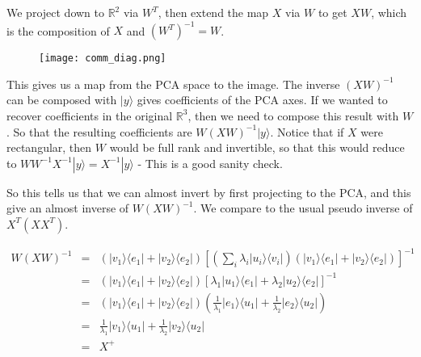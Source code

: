 \documentclass{amsbook}
\begin{document}

We project down to $\mathbb R^2$ via $W^T$, then extend the map $X$ via $W$ to get $XW$, which is the composition of $X$ and $(W^T)^{-1}=W$.

\begin{figure}
  \centering
  \texttt{[image: comm\_diag.png]}
\end{figure}

This gives us a map from the PCA space to the image.  The inverse $\left(XW\right)^{-1}$ can be composed with $|y\rangle$ gives coefficients of the PCA axes.  If we wanted to recover coefficients in the original $\mathbb R^3$, then we need to compose this result with $W$.  So that the resulting coefficients are $W\left(XW\right)^{-1}|y\rangle$.  Notice that if $X$ were rectangular, then $W$ would be full rank and invertible, so that this would reduce to $WW^{-1}X^{-1}|y\rangle=X^{-1}|y\rangle$ - This is a good sanity check.

So this tells us that we can almost invert by first projecting to the PCA, and this give an almost inverse of $W\left(XW\right)^{-1}$.  We compare to the usual pseudo inverse of $X^T\left(XX^T\right)$.

$$
\begin{array}{rcl}
W\left(XW\right)^{-1} &=& \left(|v_1\rangle\langle e_1|+|v_2\rangle\langle e_2|\right)\left[\left(\sum_i\lambda_i|u_i\rangle\langle v_i|\right)\left(|v_1\rangle\langle e_1|+|v_2\rangle\langle e_2|\right)\right]^{-1} \\
 &=& \left(|v_1\rangle\langle e_1|+|v_2\rangle\langle e_2|\right)\left[\lambda_1|u_1\rangle\langle e_1|+\lambda_2|u_2\rangle\langle e_2|\right]^{-1} \\
 &=& \left(|v_1\rangle\langle e_1|+|v_2\rangle\langle e_2|\right)\left(\frac{1}{\lambda_1}|e_1\rangle\langle u_1|+\frac{1}{\lambda_2}|e_2\rangle\langle u_2|\right) \\
 &=& \frac{1}{\lambda_1}|v_1\rangle\langle u_1|+\frac{1}{\lambda_2}|v_2\rangle\langle u_2| \\
 &=& X^+
\end{array}
$$
\end{document}
